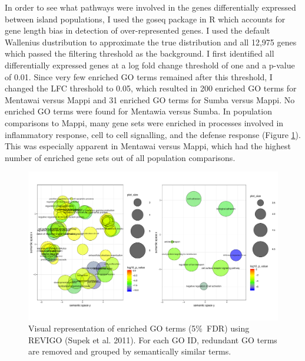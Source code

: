 \documentclass[12pt,a4paper,titlepage,twoside,openright]{book}
\begin{document}
\begin{mainmatter}
{{In order to see what pathways were involved in the genes differentially expressed between island populations, I used the goseq package in R which accounts for gene length bias in 
detection of over-represented genes. I used the default Wallenius dustribution to approximate the true distribution and all 12,975 genes which passed the filtering threshold as the background. I first identified all differentially expressed genes at a log fold change threshold of one and a p-value of 0.01. Since very few enriched GO terms remained after this threshold, I changed the LFC threshold to 0.05, which resulted in 200 enriched GO terms for Mentawai versus Mappi and 31 enriched GO terms for Sumba versus Mappi. No enriched GO terms were found for Mentawia versus Sumba. In population comparisons to Mappi, many gene sets were enriched in processes involved in inflammatory response, cell to cell signalling, and the defense response (Figure \ref{fig:Revigo}). This was especially apparent in Mentawai versus Mappi, which had the highest number of enriched gene sets out of all population comparisons. 

\begin{figure}[htb!]
\centering
\includegraphics[width=\textwidth,height=\textheight,keepaspectratio]{Figures/RevigoPlots.pdf}
\caption{Visual representation of enriched GO terms (5\%\ FDR) using REVIGO (Supek et al. 2011).  For each GO ID, redundant GO terms are removed and grouped by semantically similar terms.}
\label{fig:Revigo}
\end{figure}

}}
\end{mainmatter}
\end{document}
